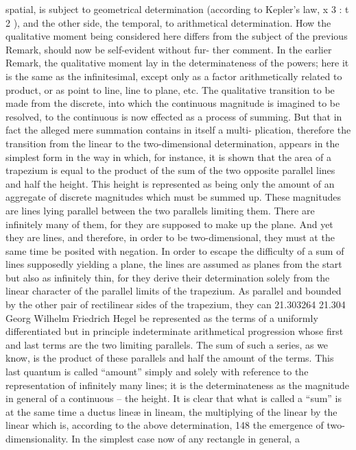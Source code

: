 spatial, is subject to geometrical determination (according to Kepler’s law,
x 3 : t 2 ), and the other side, the temporal, to arithmetical determination.
How the qualitative moment being considered here differs from the
subject of the previous Remark, should now be self-evident without fur-
ther comment. In the earlier Remark, the qualitative moment lay in the
determinateness of the powers; here it is the same as the infinitesimal,
except only as a factor arithmetically related to product, or as point to line,
line to plane, etc. The qualitative transition to be made from the discrete,
into which the continuous magnitude is imagined to be resolved, to the
continuous is now effected as a process of summing.
But that in fact the alleged mere summation contains in itself a multi-
plication, therefore the transition from the linear to the two-dimensional
determination, appears in the simplest form in the way in which, for
instance, it is shown that the area of a trapezium is equal to the product
of the sum of the two opposite parallel lines and half the height. This
height is represented as being only the amount of an aggregate of discrete
magnitudes which must be summed up. These magnitudes are lines lying
parallel between the two parallels limiting them. There are infinitely many
of them, for they are supposed to make up the plane. And yet they are lines,
and therefore, in order to be two-dimensional, they must at the same time
be posited with negation. In order to escape the difficulty of a sum of lines
supposedly yielding a plane, the lines are assumed as planes from the start
but also as infinitely thin, for they derive their determination solely from
the linear character of the parallel limits of the trapezium. As parallel and
bounded by the other pair of rectilinear sides of the trapezium, they can
21.303264
21.304
Georg Wilhelm Friedrich Hegel
be represented as the terms of a uniformly differentiated but in principle
indeterminate arithmetical progression whose first and last terms are the
two limiting parallels. The sum of such a series, as we know, is the product
of these parallels and half the amount of the terms. This last quantum is
called “amount” simply and solely with reference to the representation of
infinitely many lines; it is the determinateness as the magnitude in general
of a continuous – the height. It is clear that what is called a “sum” is at
the same time a ductus lineæ in lineam, the multiplying of the linear by the
linear which is, according to the above determination, 148 the emergence of
two-dimensionality. In the simplest case now of any rectangle in general, a
